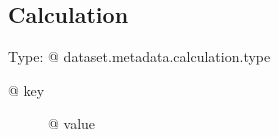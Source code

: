 \subsection{Calculation}

Type: {@ dataset.metadata.calculation.type }

\begin{description}
\item[{@ key }] {@ value }
\end{description}
